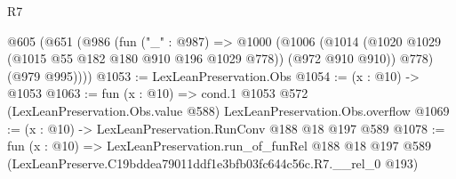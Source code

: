 \begin{lexlean}{R7}
\begin{coremodule}
  @605
    (@651
      (@986
        (fun ("_" : @987) =>
        @1000
          (@1006
            (@1014 (@1020 @1029 (@1015 @55 @182 @180 @910 @196 @1029 @778)) (@972 @910 @910))
            @778)
          (@979 @995))))
@1053 := LexLeanPreservation.Obs
@1054 := (x : @10) -> @1053
@1063 := fun (x : @10) =>
  cond.{1} @1053 @572 (LexLeanPreservation.Obs.value @588) LexLeanPreservation.Obs.overflow
@1069 := (x : @10) -> LexLeanPreservation.RunConv @188 @18 @197 @589
@1078 := fun (x : @10) =>
  LexLeanPreservation.run_of_funRel
    @188
    @18
    @197
    @589
    (LexLeanPreserve.C19bddea79011ddf1e3bfb03fc644c56c.R7.__rel_0 @193)
\end{coremodule}
\end{lexlean}
